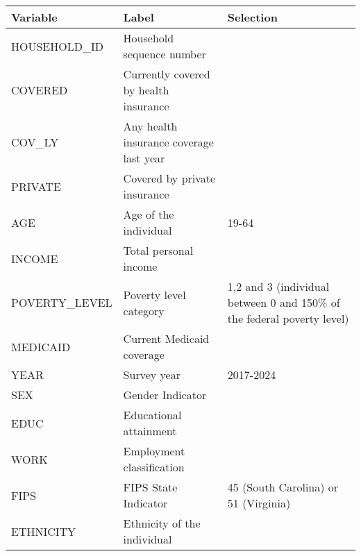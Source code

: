 \begin{table}[ht]
\centering
\begin{tabular}{lll}
  \hline
Variable & Label & Selection \\ 
  \hline
HOUSEHOLD\_ID & Household sequence number &  \\ 
  COVERED & Currently covered by health insurance &  \\ 
  COV\_LY & Any health insurance coverage last year &  \\ 
  PRIVATE & Covered by private insurance &  \\ 
  AGE & Age of the individual & 19-64 \\ 
  INCOME & Total personal income &  \\ 
  POVERTY\_LEVEL & Poverty level category & 1,2 and 3 (individual between 0 and 150\% of the federal poverty level) \\ 
  MEDICAID & Current Medicaid coverage &  \\ 
  YEAR & Survey year & 2017-2024 \\ 
  SEX & Gender Indicator &  \\ 
  EDUC & Educational attainment &  \\ 
  WORK & Employment classification &  \\ 
  FIPS & FIPS State Indicator & 45 (South Carolina) or 51 (Virginia) \\ 
  ETHNICITY & Ethnicity of the individual &  \\ 
   \hline
\end{tabular}
\end{table}

